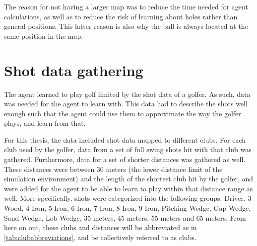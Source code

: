 \documentclass{kththesis}
\begin{document}
The reason for not having a larger map was to reduce the time needed for agent calculations, as well as to reduce the risk of learning about holes rather than general positions. This latter reason is also why the ball is always located at the same position in the map.

\section{Shot data gathering}
\label{sec:datagathering}
The agent learned to play golf limited by the shot data of a golfer. As such, data was needed for the agent to learn with. This data had to describe the shots well enough such that the agent could use them to approximate the way the golfer plays, and learn from that.

For this thesis, the data included shot data mapped to different clubs. For each club used by the golfer, data from a set of full swing shots hit with that club was gathered. Furthermore, data for a set of shorter distances was gathered as well. These distances were between 30 meters (the lower distance limit of the simulation environment) and the length of the shortest club hit by the golfer, and were added for the agent to be able to learn to play within that distance range as well. More specifically, shots were categorized into the following groups: Driver, 3 Wood, 4 Iron, 5 Iron, 6 Iron, 7 Iron, 8 Iron, 9 Iron, Pitching Wedge, Gap Wedge, Sand Wedge, Lob Wedge, 35 meters, 45 meters, 55 meters and 65 meters. From here on out, these clubs and distances will be abbreviated as in \autoref{tab:clubabbreviations}, and be collectively referred to as clubs.
\end{document}
